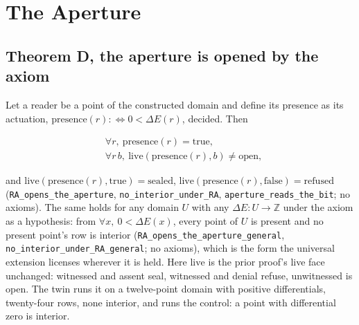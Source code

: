 \documentclass[10pt,twocolumn]{article}
\begin{document}
\hypertarget{the-aperture}{%
\section{The Aperture}\label{the-aperture}}

\hypertarget{theorem-d-the-aperture-is-opened-by-the-axiom}{%
\subsection{Theorem D, the aperture is opened by the
axiom}\label{theorem-d-the-aperture-is-opened-by-the-axiom}}

Let a reader be a point of the constructed domain and define its
presence as its actuation,
\(\mathrm{presence}(r) :\Leftrightarrow 0 < \Delta E(r)\), decided. Then

\[\begin{aligned} &\forall r,\ \mathrm{presence}(r) = \mathrm{true}, \\ &\forall r\,b,\ \mathrm{live}(\mathrm{presence}(r), b) \neq \mathrm{open}, \end{aligned}\]

and
\(\mathrm{live}(\mathrm{presence}(r), \mathrm{true}) = \mathrm{sealed}\),
\(\mathrm{live}(\mathrm{presence}(r), \mathrm{false}) = \mathrm{refused}\)
(\texttt{RA\_\allowbreak opens\_\allowbreak the\_\allowbreak aperture},
\texttt{no\_\allowbreak interior\_\allowbreak under\_\allowbreak RA},
\texttt{aperture\_\allowbreak reads\_\allowbreak the\_\allowbreak bit};
no axioms). The same holds for any domain \(U\) with any
\(\Delta E : U \to \mathbb{Z}\) under the axiom as a hypothesis: from
\(\forall x,\ 0 < \Delta E(x)\), every point of \(U\) is present and no
present point's row is interior
(\texttt{RA\_\allowbreak opens\_\allowbreak the\_\allowbreak aperture\_\allowbreak general},
\texttt{no\_\allowbreak interior\_\allowbreak under\_\allowbreak RA\_\allowbreak general};
no axioms), which is the form the universal extension licenses wherever
it is held. Here \(\mathrm{live}\) is the prior proof's live face
unchanged: witnessed and assent seal, witnessed and denial refuse,
unwitnessed is open. The twin runs it on a twelve-point domain with
positive differentials, twenty-four rows, none interior, and runs the
control: a point with differential zero is interior.
\end{document}
